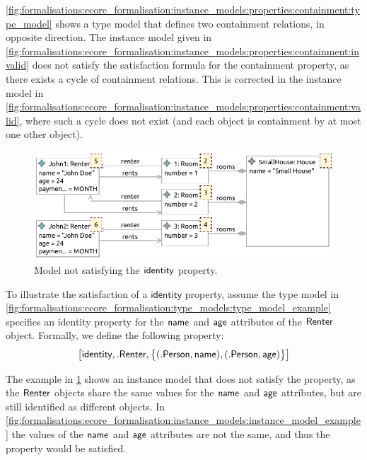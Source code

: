\cref{fig:formalisations:ecore_formalisation:instance_models:properties:containment:type_model} shows a type model that defines two containment relations, in opposite direction. The instance model given in \cref{fig:formalisations:ecore_formalisation:instance_models:properties:containment:invalid} does not satisfy the satisfaction formula for the containment property, as there exists a cycle of containment relations. This is corrected in the instance model in \cref{fig:formalisations:ecore_formalisation:instance_models:properties:containment:valid}, where such a cycle does not exist (and each object is containment by at most one other object).

\begin{figure}[p]
    \centering
    \includegraphics{images/03_formalisations/02_ecore_formalisation/properties/invalid_identity.pdf}
    \caption{Model not satisfying the $\mathsf{identity}$ property.}
    \label{fig:formalisations:ecore_formalisation:instance_models:properties:identity}
\end{figure}

To illustrate the satisfaction of a $\textsf{identity}$ property, assume the type model in \cref{fig:formalisations:ecore_formalisation:type_models:type_model_example} specifies an identity property for the $\mathsf{name}$ and $\mathsf{age}$ attributes of the $\mathsf{Renter}$ object. Formally, we define the following property:
\begin{equation*}
  \big[ \textsf{identity}, .\mathsf{Renter}, \big\{ ( .\mathsf{Person}, \mathsf{name} ), ( .\mathsf{Person}, \mathsf{age} ) \big\} \big]  
\end{equation*}

The example in \cref{fig:formalisations:ecore_formalisation:instance_models:properties:identity} shows an instance model that does not satisfy the property, as the $\mathsf{Renter}$ objects share the same values for the $\mathsf{name}$ and $\mathsf{age}$ attributes, but are still identified as different objects. In \cref{fig:formalisations:ecore_formalisation:instance_models:instance_model_example} the values of the $\mathsf{name}$ and $\mathsf{age}$ attributes are not the same, and thus the property would be satisfied.

